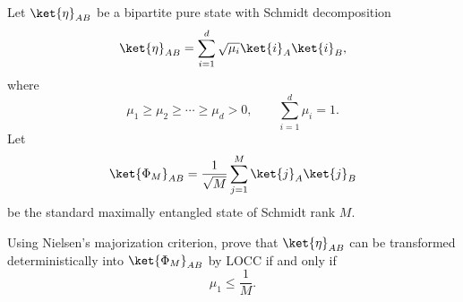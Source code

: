 Let $\ket{\eta}_{AB}$ be a bipartite pure state with Schmidt decomposition
$$
\ket{\eta}_{AB}
=
\sum_{i=1}^d
\sqrt{\mu_i}
\ket{i}_A\ket{i}_B,
$$
where
$$
\mu_1\geq \mu_2\geq \cdots \geq \mu_d>0,
\qquad
\sum_{i=1}^d \mu_i=1.
$$
Let
$$
\ket{\Phi_M}_{AB}
=
\frac{1}{\sqrt{M}}
\sum_{j=1}^M
\ket{j}_A\ket{j}_B
$$
be the standard maximally entangled state of Schmidt rank $M$.

Using Nielsen's majorization criterion, prove that $\ket{\eta}_{AB}$ can be transformed deterministically into $\ket{\Phi_M}_{AB}$ by LOCC if and only if
$$
\mu_1\leq \frac1M.
$$
